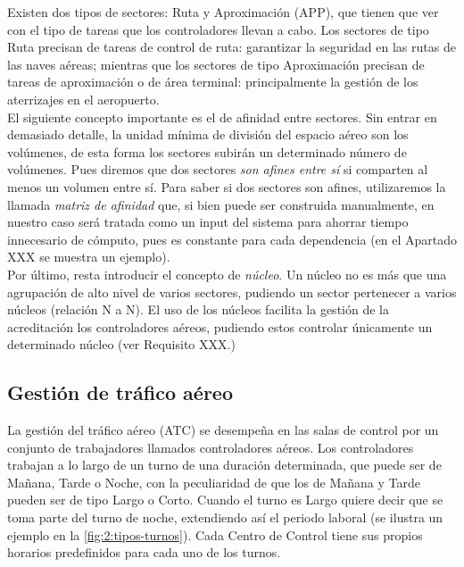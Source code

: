 Existen dos tipos de sectores: Ruta y Aproximación (APP), que tienen que ver con el tipo de tareas que los 
controladores llevan a cabo.
Los sectores de tipo Ruta precisan de tareas de control de ruta: garantizar la seguridad en las rutas de las naves 
aéreas; mientras que los sectores de tipo Aproximación precisan de tareas de aproximación o de área terminal: 
principalmente la gestión de los aterrizajes en el aeropuerto.
\\

El siguiente concepto importante es el de afinidad entre sectores. Sin entrar en demasiado detalle, la unidad mínima de
división del espacio aéreo son los volúmenes, de esta forma los sectores subirán un determinado número de volúmenes.
Pues diremos que dos sectores \textit{son afines entre sí} si comparten al menos un volumen entre sí. Para saber si dos
sectores son afines, utilizaremos la llamada \textit{matriz de afinidad} que, si bien puede ser construida manualmente,
en nuestro caso será tratada como un input del sistema para ahorrar tiempo innecesario de cómputo, pues es constante 
para cada dependencia (en el Apartado XXX se muestra un ejemplo). %
\\

Por último, resta introducir el concepto de \textit{núcleo}. Un núcleo no es más que una agrupación de alto nivel de
varios sectores, pudiendo un sector pertenecer a varios núcleos (relación N a N). El uso de los núcleos facilita la
gestión de la acreditación los controladores aéreos, pudiendo estos controlar únicamente un determinado núcleo (ver 
Requisito XXX.) %


% 

\subsection{Gestión de tráfico aéreo}
La gestión del tráfico aéreo (\gls{ATC}) se desempeña en las salas de control por un conjunto de trabajadores 
llamados controladores aéreos. Los controladores trabajan a lo largo de un turno de una duración determinada, que puede 
ser de Mañana, Tarde o Noche, con la peculiaridad de que los de Mañana y Tarde pueden ser de tipo Largo o Corto. Cuando 
el turno es Largo quiere decir que se toma parte del turno de noche, extendiendo así el periodo laboral (se ilustra un 
ejemplo en la \autoref{fig:2:tipos-turnos}). Cada \acrlong{Centro de Control} tiene sus propios 
horarios 
predefinidos para cada uno de los turnos.
\\

